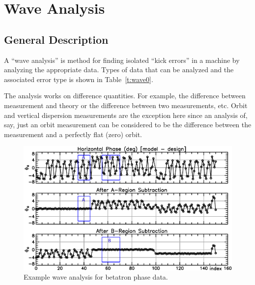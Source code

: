 \chapter{Wave Analysis}
\label{c:wave}

\section{General Description}
\label{s:wave.general}

A ``wave analysis'' is method for finding isolated ``kick errors'' in a machine by analyzing the
appropriate data. Types of data that can be analyzed and the associated error type is shown in
Table~\ref{t:wave0}.

The analysis works on difference quantities. For example, the difference between measurement and
theory or the difference between two measurements, etc. Orbit and vertical dispersion measurements
are the exception here since an analysis of, say, just an orbit measurement can be considered to be
the difference between the measurement and a perfectly flat (zero) orbit.

\begin{table}[h]
\caption[Wave measurement types.]
{Types of measurements that can be used in a wave analysis and the 
types of errors that can be diagnosed.}
\label{t:wave0}
\end{table}

\begin{figure}[t]
  \centering
  \includegraphics[width=6in]{wave.pdf}
  \caption[Example wave analysis.]
{Example wave analysis for betatron phase data.}
  \label{f:wave}
\end{figure}

